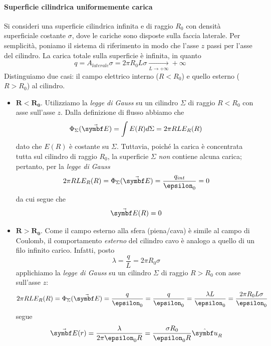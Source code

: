 \paragraph{Superficie cilindrica uniformemente carica}
Si consideri una superficie cilindrica infinita e di raggio $R_0$ con densità superficiale costante $\sigma$, dove le cariche sono disposte sulla faccia laterale. Per semplicità, poniamo il sistema di riferimento in modo che l'asse $z$ passi per l'asse del cilindro.
La carica totale sulla superficie è infinita, in quanto
\begin{equation}
	q=A_{laterale} \sigma=2\pi R_0 L \sigma\underset{L\to+\infty}{\longrightarrow}+\infty
\end{equation}
Distinguiamo due casi: il campo elettrico interno ($R<R_0$) e quello esterno ($R>R_0$) al cilindro.
\begin{itemize}
	\item $\mathbf{R<R_0}$. Utilizziamo la \textit{legge di Gauss} su un cilindro $\Sigma$ di raggio $R<R_0$ con asse sull'asse $z$. Dalla definizione di flusso abbiamo che
	\begin{equation*}
		\Phi_{\Sigma}(\vba{E})=\int E(R)d\Sigma=2\pi R L E_R(R)
	\end{equation*}
	dato che $E(R)$ è costante su $\Sigma$.
	Tuttavia, poiché la carica è concentrata tutta sul cilindro di raggio $R_0$, la superficie $\Sigma$ \textit{non} contiene alcuna carica; pertanto, per la \textit{legge di Gauss}
	\begin{equation*}
		2\pi R L E_R(R)=\Phi_{\Sigma}(\vba{E})=\frac{q_{int}}{\epsilon_0}=0
	\end{equation*}
	da cui segue che
	\begin{equation}
		\vba{E}(R)=0
	\end{equation}
	\item $\mathbf{R>R_0}$. Come il campo esterno alla sfera (piena/cava) è simile al campo di Coulomb, il comportamento \textit{esterno} del cilindro cavo è analogo a quello di un filo infinito carico. Infatti, posto
	\begin{equation*}
		\lambda=\frac{q}{L}=2\pi R_0 \sigma
	\end{equation*}
	applichiamo la \textit{legge di Gauss} su un cilindro $\Sigma$ di raggio $R>R_0$ con asse sull'asse $z$:
	\begin{equation*}
		2\pi R L E_R(R)=\Phi_{\Sigma}(\vba{E})=\frac{q}{\epsilon_0}=\frac{q}{\epsilon_0}=\frac{\lambda L}{\epsilon_0}=\frac{2\pi R_0 L \sigma}{\epsilon_0}
	\end{equation*}
	segue
	\begin{equation}
		\vba{E}(r)=\frac{\lambda}{2\pi \epsilon_0 R}=\frac{\sigma R_0}{\epsilon_0 R}\vbh{u}_R
	\end{equation}
\end{itemize}
